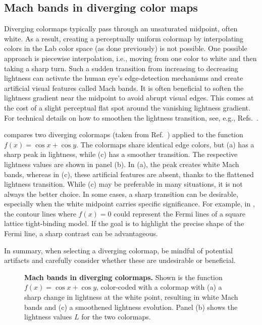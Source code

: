 \subsection{Mach bands in diverging color maps}

Diverging colormaps typically pass through an unsaturated midpoint, often white. As a result, creating a perceptually uniform colormap by interpolating colors in the Lab color space (as done previously) is not possible. One possible approach is piecewise interpolation, i.e., moving from one color to white and then taking a sharp turn.  Such a sudden transition from increasing to decreasing lightness can activate the human eye's edge-detection mechanisms and create artificial visual features called Mach bands. It is often beneficial to soften the lightness gradient near the midpoint to avoid abrupt visual edges. This comes at the cost of a slight perceptual flat spot around the vanishing lightness gradient. For technical details on how to smoothen the lightness transition, see, e.g., Refs.~\cite{moreland2009,kovesi2015}.

 compares two diverging colormaps (taken from Ref.~\cite{moreland2009}) applied to the function $f(x) = \cos x + \cos y$. The colormaps share identical edge colors, but (a) has a sharp peak in lightness, while (c) has a smoother transition. The respective lightness values are shown in panel (b). In (a), the peak creates white Mach bands, whereas in (c), these artificial features are absent, thanks to the flattened lightness transition.
While (c) may be preferable in many situations, it is not always the better choice. In some cases, a sharp transition can be desirable, especially when the white midpoint carries specific significance. For example, in , the contour lines where $f(x)=0$ could represent the Fermi lines of a square lattice tight-binding model. If the goal is to highlight the precise shape of the Fermi line, a sharp contrast can be advantageous.

In summary, when selecting a diverging colormap, be mindful of potential artifacts and carefully consider whether these are undesirable or beneficial.

\begin{figure}
	\centering
	
	\caption{\textbf{Mach bands in diverging colormaps.} Shown is the function $f(x) = \cos x + \cos y$, color-coded with a colormap with (a) a sharp change in lightness at the white point, resulting in white Mach bands and (c) a smoothened lightness evolution. Panel (b) shows the lightness values $L$ for the two colormaps.}
	\label{fig:machbands}
\end{figure}




